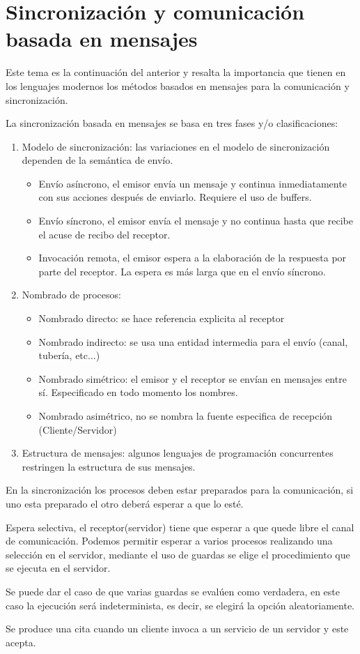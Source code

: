 \section{Sincronización y comunicación basada en mensajes}

Este tema es la continuación del anterior y resalta la importancia que tienen en
los lenguajes modernos los métodos basados en mensajes para la comunicación y
sincronización.

La sincronización basada en mensajes se basa en tres fases y/o clasificaciones:

\begin{enumerate}
	\item Modelo de sincronización: las variaciones en el modelo de
sincronización dependen de la semántica de envío.

	\begin{itemize}
		\item Envío asíncrono, el emisor envía un mensaje y continua
inmediatamente con sus acciones después de enviarlo. Requiere el uso de buffers.
		\item Envío síncrono, el emisor envía el mensaje y no continua
hasta que recibe el acuse de recibo del receptor.
		\item Invocación remota, el emisor espera a la elaboración de la
respuesta por parte del receptor. La espera es más larga que en el envío
síncrono.
	\end{itemize}

	\item Nombrado de procesos:
		\begin{itemize}
			\item Nombrado directo: se hace referencia explicita al
receptor
			\item Nombrado indirecto: se usa una entidad intermedia
para el envío (canal, tubería, etc...)
			\item Nombrado simétrico: el emisor y el receptor se
envían en mensajes entre sí. Especificado en todo momento los nombres.
			\item Nombrado asimétrico, no se nombra la fuente
especifica de recepción (Cliente/Servidor)
		\end{itemize}
	\item Estructura de mensajes: algunos lenguajes de programación
concurrentes restringen la estructura de sus mensajes.
\end{enumerate}

En la sincronización los procesos deben estar preparados para la comunicación,
si uno esta preparado el otro deberá esperar a que lo esté.

Espera selectiva, el receptor(servidor) tiene que esperar a que quede libre el
canal de comunicación. Podemos permitir esperar a varios procesos realizando una
selección en el servidor, mediante el uso de guardas se elige el procedimiento
que se ejecuta en el servidor.

Se puede dar el caso de que varias guardas se evalúen como verdadera, en este
caso la ejecución será indeterminista, es decir, se elegirá la opción
aleatoriamente.

Se produce una cita cuando un cliente invoca a un servicio de un servidor y este
acepta.

